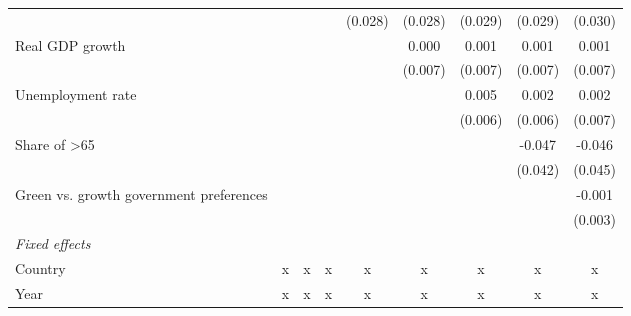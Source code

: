 \begin{table}[htbp]
\begin{tabular}{lcccccccc}
                                                                                       &         &         &                & (0.028)        & (0.028)        & (0.029)        & (0.029)        & (0.030)\\   
      Real GDP growth                                                                  &         &         &                &                & 0.000          & 0.001          & 0.001          & 0.001\\   
                                                                                       &         &         &                &                & (0.007)        & (0.007)        & (0.007)        & (0.007)\\   
      Unemployment rate                                                                &         &         &                &                &                & 0.005          & 0.002          & 0.002\\   
                                                                                       &         &         &                &                &                & (0.006)        & (0.006)        & (0.007)\\   
      Share of >65                                                                     &         &         &                &                &                &                & -0.047         & -0.046\\   
                                                                                       &         &         &                &                &                &                & (0.042)        & (0.045)\\   
      Green vs. growth government preferences                                          &         &         &                &                &                &                &                & -0.001\\   
                                                                                       &         &         &                &                &                &                &                & (0.003)\\   
      \emph{Fixed effects}\\
      Country                                                                          & x       & x       & x              & x              & x              & x              & x              & x\\  
      Year                                                                             & x       & x       & x              & x              & x              & x              & x              & x\\  

\end{tabular}
\end{table}
